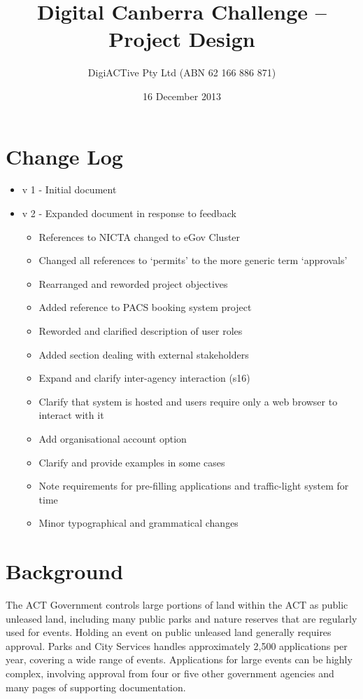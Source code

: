 \documentclass[12pt,a4paper,twosided]{article}
\title{Digital Canberra Challenge -- Project Design}
\author{DigiACTive Pty Ltd (ABN 62 166 886 871)}
\date{16 December 2013}
\begin{document}
\maketitle
\section{Change Log}

\begin{itemize}
\itemsep1pt\parskip0pt
\item
  v 1 - Initial document
\item
  v 2 - Expanded document in response to feedback

  \begin{itemize}
  \itemsep1pt\parskip0pt
  \item
    References to NICTA changed to eGov Cluster
  \item
    Changed all references to `permits' to the more generic term
    `approvals'
  \item
    Rearranged and reworded project objectives
  \item
    Added reference to PACS booking system project
  \item
    Reworded and clarified description of user roles
  \item
    Added section dealing with external stakeholders
  \item
    Expand and clarify inter-agency interaction (s16)
  \item
    Clarify that system is hosted and users require only a web browser
    to interact with it
  \item
    Add organisational account option
  \item
    Clarify and provide examples in some cases
  \item
    Note requirements for pre-filling applications and traffic-light
    system for time
  \item
    Minor typographical and grammatical changes
  \end{itemize}
\end{itemize}

\section{Background}

The ACT Government controls large portions of land within the ACT as
public unleased land, including many public parks and nature reserves
that are regularly used for events. Holding an event on public unleased
land generally requires approval. Parks and City Services handles
approximately 2,500 applications per year, covering a wide range of
events. Applications for large events can be highly complex, involving
approval from four or five other government agencies and many pages of
supporting documentation.
\end{document}
